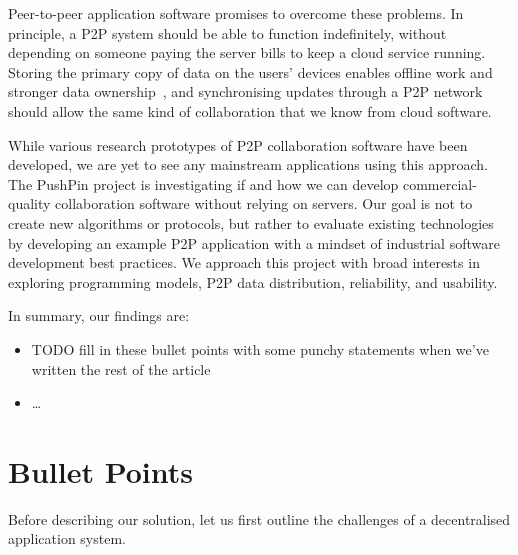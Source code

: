 \documentclass[sigplan,10pt]{acmart}
\begin{document}
Peer-to-peer application software promises to overcome these problems.
In principle, a P2P system should be able to function indefinitely, without depending on someone paying the server bills to keep a cloud service running.
Storing the primary copy of data on the users' devices enables offline work and stronger data ownership~\cite{LocalFirst}, and synchronising updates through a P2P network should allow the same kind of collaboration that we know from cloud software.

While various research prototypes of P2P collaboration software have been developed, we are yet to see any mainstream applications using this approach.
The PushPin project is investigating if and how we can develop commercial-quality collaboration software without relying on servers.
Our goal is not to create new algorithms or protocols, but rather to evaluate existing technologies by developing an example P2P application with a mindset of industrial software development best practices.
We approach this project with broad interests in exploring programming models, P2P data distribution, reliability, and usability.

In summary, our findings are:
\begin{itemize}
    \item TODO fill in these bullet points with some punchy statements when we've written the rest of the article
    \item \dots
\end{itemize}





\section{Bullet Points}

Before describing our solution, let us first outline the challenges of a decentralised application system.
\end{document}
